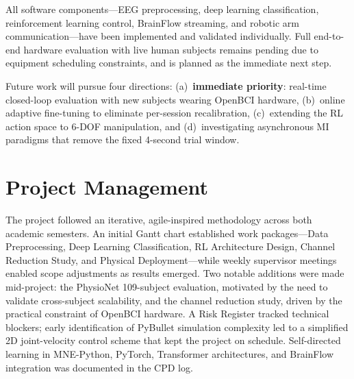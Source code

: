 \documentclass[12pt, a4paper]{article}
\begin{document}
All software components---EEG preprocessing, deep learning classification, reinforcement learning control, BrainFlow streaming, and robotic arm communication---have been implemented and validated individually. Full end-to-end hardware evaluation with live human subjects remains pending due to equipment scheduling constraints, and is planned as the immediate next step.

Future work will pursue four directions: (a)~\textbf{immediate priority}: real-time closed-loop evaluation with new subjects wearing OpenBCI hardware, (b)~online adaptive fine-tuning to eliminate per-session recalibration, (c)~extending the RL action space to 6-DOF manipulation, and (d)~investigating asynchronous MI paradigms that remove the fixed 4-second trial window.

\section{Project Management}

The project followed an iterative, agile-inspired methodology across both academic semesters. An initial Gantt chart established work packages---Data Preprocessing, Deep Learning Classification, RL Architecture Design, Channel Reduction Study, and Physical Deployment---while weekly supervisor meetings enabled scope adjustments as results emerged. Two notable additions were made mid-project: the PhysioNet 109-subject evaluation, motivated by the need to validate cross-subject scalability, and the channel reduction study, driven by the practical constraint of OpenBCI hardware. A Risk Register tracked technical blockers; early identification of PyBullet simulation complexity led to a simplified 2D joint-velocity control scheme that kept the project on schedule. Self-directed learning in MNE-Python, PyTorch, Transformer architectures, and BrainFlow integration was documented in the CPD log.
\end{document}
